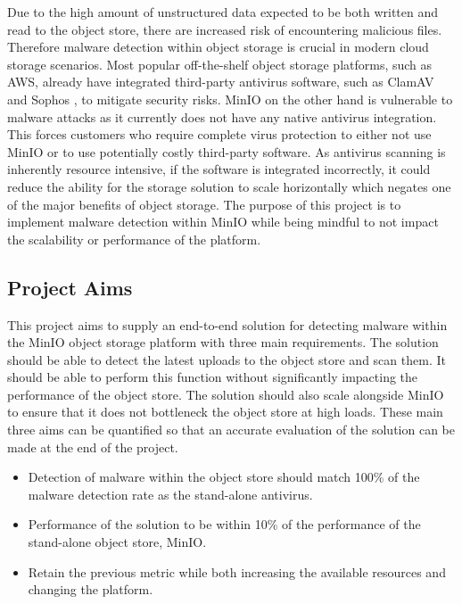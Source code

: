 \documentclass[12pt, conference, final, a4paper, onecolumn, compsoc]{IEEEtran}
\begin{document}
Due to the high amount of unstructured data expected to be both written and read
to the object store, there are increased risk of encountering malicious files.
Therefore malware detection within object storage is crucial in modern cloud
storage scenarios. Most popular off-the-shelf object storage platforms, such as
AWS, already have integrated third-party antivirus software, such as ClamAV and
Sophos \citep{amazon-md}, to mitigate security risks. MinIO on the other hand is
vulnerable to malware attacks as it currently does not have any native antivirus
integration. This forces customers who require complete virus protection to
either not use MinIO or to use potentially costly third-party software. As
antivirus scanning is inherently resource intensive, if the software is
integrated incorrectly, it could reduce the ability for the storage solution to
scale horizontally which negates one of the major benefits of object storage.
The purpose of this project is to implement malware detection within MinIO while
being mindful to not impact the scalability or performance of the platform.

\subsection*{Project Aims} %

This project aims to supply an end-to-end solution for detecting malware within
the MinIO object storage platform with three main requirements. The solution
should be able to detect the latest uploads to the object store and scan them.
It should be able to perform this function without significantly impacting the
performance of the object store. The solution should also scale alongside MinIO
to ensure that it does not bottleneck the object store at high loads. These main
three aims can be quantified so that an accurate evaluation of the solution can
be made at the end of the project.

\begin{itemize}
  \item Detection of malware within the object store should match 100\% of the
        malware detection rate as the stand-alone antivirus.
  \item Performance of the solution to be within 10\% of the performance of the
        stand-alone object store, MinIO.
  \item Retain the previous metric while both increasing the available resources
        and changing the platform.
\end{itemize}
\end{document}
